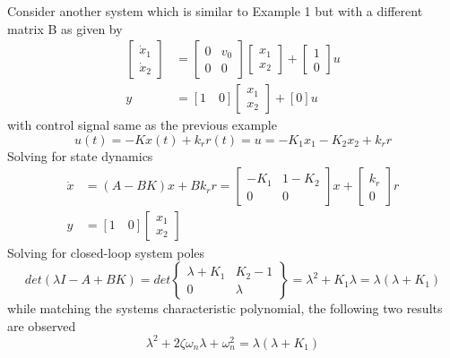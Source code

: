 Consider another system which is similar to Example 1 but with a different matrix B as given by
\begin{align}
\begin{bmatrix}
\dot{x}_1 \\ \dot{x}_2
\end{bmatrix} &= \begin{bmatrix}
0 & v_0 \\ 0 & 0
\end{bmatrix} \begin{bmatrix}
{x}_1 \\ {x}_2
\end{bmatrix} + \begin{bmatrix}
1 \\ 0
\end{bmatrix} u  \\
y &= [1 \quad 0] \begin{bmatrix}
{x}_1 \\ {x}_2 \end{bmatrix} + [0] u
\end{align}
with control signal same as the previous example
\begin{equation}
u(t) = -Kx(t) + k_r r(t) = u = -K_{1}x_{1} - K_{2}x_{2} + k_r r
\end{equation}
Solving for state dynamics
\begin{align}
	\dot{x} &= (A - BK)x + Bk_r r = \begin{bmatrix}
	-K_{1} & 1-K_{2} \\ 0 & 0
	\end{bmatrix} x + \begin{bmatrix}
	k_{r} \\ 0
	\end{bmatrix} r \\
	 y &= [1 \quad 0] \begin{bmatrix}
	 {x}_1 \\ {x}_2 \end{bmatrix}
\end{align}
Solving for closed-loop system poles
\begin{equation}
	det(\lambda I - A + BK) = det \begin{Bmatrix}
		\lambda + K_{1} & K_{2} - 1 \\ 0 & \lambda
	\end{Bmatrix} = \lambda^{2} + K_{1}\lambda = \lambda (\lambda + K_{1})
\end{equation}
while matching the systems characteristic polynomial, the following two results are observed
\begin{equation}
	\lambda^{2} + 2 \zeta \omega_{n} \lambda + \omega_{n}^{2} = \lambda (\lambda + K_{1})
\end{equation}
